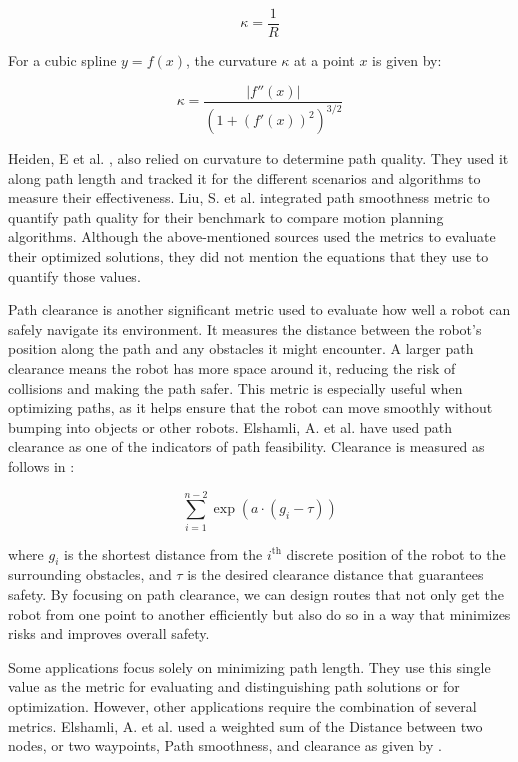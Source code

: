 \begin{equation}
    \kappa = \frac{1}{R}
    \label{kurv}
\end{equation}

For a cubic spline \( y = f(x) \), the curvature \( \kappa \) at a point \( x \) is given by:

\begin{equation}
\kappa = \frac{|f''(x)|}{\left(1 + \left(f'(x)\right)^2\right)^{3/2}}
\end{equation}

Heiden, E et al. \cite{R23}, also relied on curvature to determine path quality. They used it along 
path length and tracked it for the different scenarios and algorithms to measure their effectiveness.
Liu, S. et al. integrated path smoothness metric to quantify path quality for their benchmark to compare
motion planning algorithms\cite{R35}.
Although the above-mentioned sources used the metrics to evaluate their optimized solutions,
they did not mention the equations that they use to quantify those values.

Path clearance is another significant metric used to evaluate how well a robot can safely navigate 
its environment. It measures the distance between the robot's position along the path and any obstacles 
it might encounter. A larger path clearance means the robot has more space around it, reducing the risk 
of collisions and making the path safer. This metric is especially useful when optimizing paths, as it 
helps ensure that the robot can move smoothly without bumping into objects or other robots. 
Elshamli, A. et al. \cite{R17} have used path clearance as one of the indicators of path feasibility.
Clearance is measured as follows in :

\begin{equation}
    \sum_{i=1}^{n-2} \exp\left(a \cdot (g_i - \tau)\right)
    \label{clear}
\end{equation}

where \(g_i\) is the shortest distance from the \(i^{\text{th}}\) discrete position of the 
robot to the surrounding obstacles, and \(\tau\) is the desired clearance distance that 
guarantees safety. By focusing 
on path clearance, we can design routes that not only get the robot from one point to another efficiently 
but also do so in a way that minimizes risks and improves overall safety.


Some applications focus solely on minimizing path length. They use this single value as the 
metric for evaluating and distinguishing path solutions or for optimization. However, other 
applications require the combination of several metrics.
Elshamli, A. et al. \cite{R17} used a weighted sum of the Distance between two nodes, or two waypoints,
Path smoothness, and clearance as given by . 

